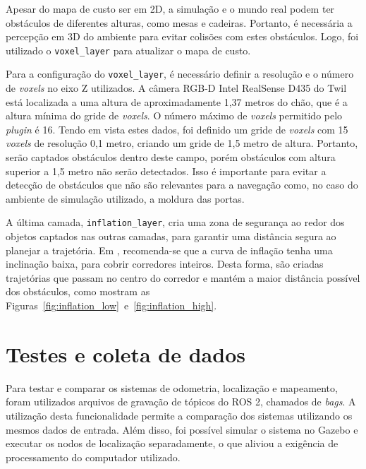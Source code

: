 \documentclass[repeatfields,xlists,xpacks,oneside,yearsonly]{ufrgscca}
\begin{document}
Apesar do mapa de custo ser em 2D, a simulação e o mundo real podem ter obstáculos
de diferentes alturas, como mesas e cadeiras. Portanto, é necessária a percepção em 
3D do ambiente para evitar colisões com estes obstáculos. Logo, foi utilizado o
\texttt{voxel\_layer} para atualizar o mapa de custo.

Para a configuração do \texttt{voxel\_layer}, é necessário definir a resolução
e o número de \textit{voxels} no eixo Z utilizados. 
A câmera RGB-D Intel RealSense D435 do Twil está localizada a uma altura de aproximadamente
1,37 metros do chão, que é a altura mínima do gride de \textit{voxels}.
O número máximo de \textit{voxels} permitido pelo \textit{plugin} é 16.
Tendo em vista estes dados, foi definido um gride de \textit{voxels} com 15 \textit{voxels}
de resolução 0,1 metro, criando um gride de 1,5 metro de altura.
Portanto, serão captados obstáculos dentro deste campo, porém obstáculos com altura
superior a 1,5 metro não serão detectados.
Isso é importante para evitar a detecção de obstáculos que não são relevantes para
a navegação como, no caso do ambiente de simulação utilizado, a moldura das portas.


A última camada, \texttt{inflation\_layer}, cria uma zona de segurança ao redor
dos objetos captados nas outras camadas, para garantir uma distância segura
ao planejar a trajetória.
Em \textcite{ros_tuning_guide}, recomenda-se que a curva de inflação tenha uma
inclinação baixa, para cobrir corredores inteiros.
Desta forma, são criadas trajetórias que passam no centro do corredor e
mantém a maior distância possível dos obstáculos,
como mostram as Figuras~\ref{fig:inflation_low}~e~\ref{fig:inflation_high}.

\section{Testes e coleta de dados}
\label{met:testes}

Para testar e comparar os sistemas de odometria, localização e mapeamento,
foram utilizados arquivos de gravação de tópicos do ROS 2, chamados de 
\textit{bags}.
A utilização desta funcionalidade permite a comparação dos sistemas 
utilizando os mesmos dados de entrada.
Além disso, foi possível simular o sistema no Gazebo e executar os nodos 
de localização separadamente, o que aliviou a exigência de processamento
do computador utilizado.
\end{document}
